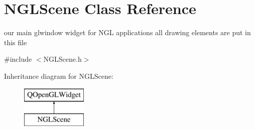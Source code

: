 \hypertarget{classNGLScene}{\section{N\-G\-L\-Scene Class Reference}
\label{classNGLScene}
}


our main glwindow widget for N\-G\-L applications all drawing elements are put in this file  




{\ttfamily \#include $<$N\-G\-L\-Scene.\-h$>$}

Inheritance diagram for N\-G\-L\-Scene\-:\begin{figure}[H]
\begin{center}
\leavevmode
\includegraphics[height=2.000000cm]{classNGLScene}
\end{center}
\end{figure}

